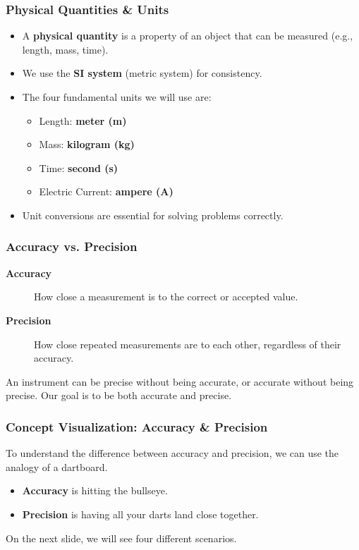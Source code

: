 \documentclass{beamer}
\begin{document}
\begin{frame}
\frametitle{Physical Quantities \& Units}
\begin{itemize}
    \item A \textbf{physical quantity} is a property of an object that can be measured (e.g., length, mass, time).
    \pause
    \item We use the \textbf{SI system} (metric system) for consistency.
    \pause
    \item The four fundamental units we will use are:
    \pause
    \begin{itemize}
        \item Length: \textbf{meter (m)}
        \pause
        \item Mass: \textbf{kilogram (kg)}
        \pause
        \item Time: \textbf{second (s)}
        \pause
        \item Electric Current: \textbf{ampere (A)}
    \end{itemize}
    \pause
    \item Unit conversions are essential for solving problems correctly.
\end{itemize}
\end{frame}

\begin{frame}
\frametitle{Accuracy vs. Precision}
\begin{description}
    \item[\textbf{Accuracy}] How close a measurement is to the correct or accepted value.
    \item[\textbf{Precision}] How close repeated measurements are to each other, regardless of their accuracy.
\end{description}
\vspace{1em}
An instrument can be precise without being accurate, or accurate without being precise. Our goal is to be both accurate and precise.
\end{frame}

\begin{frame}
\frametitle{Concept Visualization: Accuracy \& Precision}
To understand the difference between accuracy and precision, we can use the analogy of a dartboard.
\begin{itemize}
    \item \textbf{Accuracy} is hitting the bullseye.
    \item \textbf{Precision} is having all your darts land close together.
\end{itemize}
On the next slide, we will see four different scenarios.
\end{frame}
\end{document}
